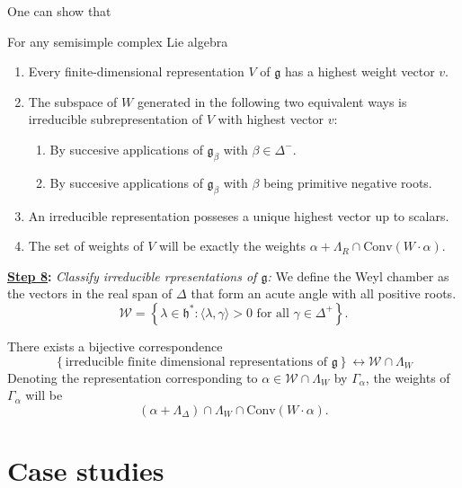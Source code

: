 \documentclass{report}
\begin{document}
One can show that
\begin{proposition}
    For any semisimple complex Lie algebra
    \begin{enumerate}[label = (\roman*)]
        \item Every finite-dimensional representation $V$ of $\mathfrak g$ has a highest weight vector $v$.
        \item The subspace of $W$ generated in the following two equivalent ways is irreducible subrepresentation of $V$ with highest vector $v$:
        \begin{enumerate}[label = (\alph*)]
            \item By succesive applications of $\mathfrak g_\beta$ with $\beta \in \Delta^-$.
            \item By succesive applications of $\mathfrak g_\beta$ with $\beta$ being primitive negative roots. 
        \end{enumerate}
        \item An irreducible representation posseses a unique highest vector up to scalars.
        \item The set of weights of $V$ will be exactly the weights $\alpha + \Lambda_R \cap \mathrm{Conv}(W \cdot \alpha)$.
    \end{enumerate}
\end{proposition}




{\bf \underline{Step 8}:} \emph{Classify irreducible rpresentations of $\mathfrak g$:}
We define the Weyl chamber as the vectors in the real span of $\Delta$ that form an acute angle with all positive roots.
\[
\mathcal W = \left\{ \lambda \in \mathfrak h^*: \langle \lambda, \gamma \rangle > 0 \text{ for all } \gamma \in \Delta^+ \right\}.
\]
\begin{theorem}
    There exists a bijective correspondence
    \[
    \left\{ \text{irreducible finite dimensional representations of } \mathfrak g \right\} \leftrightarrow \mathcal W \cap \Lambda_W
    \]
    Denoting the representation corresponding to $\alpha \in \mathcal W \cap \Lambda_W$ by $\Gamma_\alpha$, the weights of $\Gamma_\alpha$ will be $$(\alpha + \Lambda_\Delta) \cap \Lambda_W \cap \mathrm{Conv}(W \cdot \alpha).$$
\end{theorem}

\chapter{Case studies}
\end{document}
